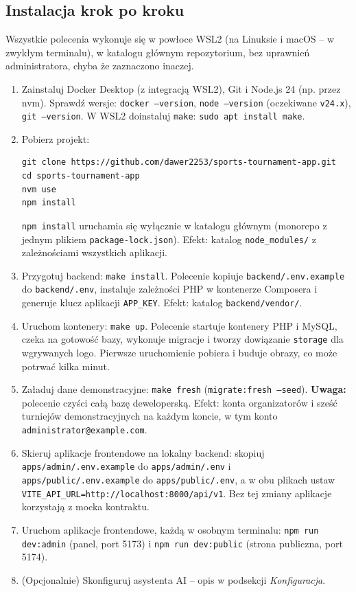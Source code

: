 \documentclass[11pt,a4paper,oneside]{article}
\newif\ifpodpowiedzi
\newcommand{\podpowiedz}[1]{\ifpodpowiedzi\par\begingroup\small\color{hintcolor}\textit{Wskazówka: #1}\par\endgroup\fi}
\begin{document}
\subsection{Instalacja krok po kroku}
\podpowiedz{Podaj czynności w kolejności wykonania, z rzeczywistymi poleceniami lub opisem działań w interfejsie. Przy poleceniach wskaż katalog roboczy i wymagane uprawnienia. Opisz budowanie projektu, przygotowanie bazy danych i innych komponentów, jeśli dotyczy. Po istotnych krokach podaj oczekiwany efekt. Poniższe punkty zastąp instrukcją dla własnego projektu.}
Wszystkie polecenia wykonuje się w powłoce WSL2 (na Linuksie i macOS -- w zwykłym terminalu), w katalogu głównym repozytorium, bez uprawnień administratora, chyba że zaznaczono inaczej.
\begin{enumerate}
\item Zainstaluj Docker Desktop (z integracją WSL2), Git i Node.js 24 (np. przez nvm). Sprawdź wersje: \texttt{docker --version}, \texttt{node --version} (oczekiwane \texttt{v24.x}), \texttt{git --version}. W WSL2 doinstaluj \texttt{make}: \texttt{sudo apt install make}.
\item Pobierz projekt:
\begin{verbatim}
git clone https://github.com/dawer2253/sports-tournament-app.git
cd sports-tournament-app
nvm use
npm install
\end{verbatim}
\texttt{npm install} uruchamia się wyłącznie w katalogu głównym (monorepo z jednym plikiem \texttt{package-lock.json}). Efekt: katalog \texttt{node\_modules/} z zależnościami wszystkich aplikacji.
\item Przygotuj backend: \texttt{make install}. Polecenie kopiuje \texttt{backend/.env.example} do \texttt{backend/.env}, instaluje zależności PHP w kontenerze Composera i generuje klucz aplikacji \texttt{APP\_KEY}. Efekt: katalog \texttt{backend/vendor/}.
\item Uruchom kontenery: \texttt{make up}. Polecenie startuje kontenery PHP i MySQL, czeka na gotowość bazy, wykonuje migracje i tworzy dowiązanie \texttt{storage} dla wgrywanych logo. Pierwsze uruchomienie pobiera i buduje obrazy, co może potrwać kilka minut.
\item\label{krok:fresh} Załaduj dane demonstracyjne: \texttt{make fresh} (\texttt{migrate:fresh --seed}). \textbf{Uwaga:} polecenie czyści całą bazę deweloperską. Efekt: konta organizatorów i sześć turniejów demonstracyjnych na każdym koncie, w tym konto \texttt{administrator@example.com}.
\item Skieruj aplikacje frontendowe na lokalny backend: skopiuj \texttt{apps/admin/.env.example} do \texttt{apps/admin/.env} i \texttt{apps/public/.env.example} do \texttt{apps/public/.env}, a w obu plikach ustaw \texttt{VITE\_API\_URL=http://localhost:8000/api/v1}. Bez tej zmiany aplikacje korzystają z mocka kontraktu.
\item Uruchom aplikacje frontendowe, każdą w osobnym terminalu: \texttt{npm run dev:admin} (panel, port 5173) i \texttt{npm run dev:public} (strona publiczna, port 5174).
\item (Opcjonalnie) Skonfiguruj asystenta AI -- opis w podsekcji \emph{Konfiguracja}.
\end{enumerate}
\end{document}
